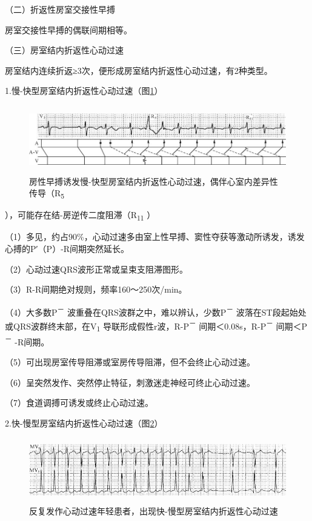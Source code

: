 （二）折返性房室交接性早搏

房室交接性早搏的偶联间期相等。

（三）房室结内折返性心动过速

房室结内连续折返≥3次，便形成房室结内折返性心动过速，有2种类型。

1.慢-快型房室结内折返性心动过速（图\ref{fig14-11}）

\begin{figure}[!htbp]
 \centering
 \includegraphics[width=5.79167in,height=1.15625in]{./images/Image00257.jpg}
 \captionsetup{justification=centering}
 \caption{房性早搏诱发慢-快型房室结内折返性心动过速，偶伴心室内差异性传导（R\textsubscript{5}}
 \label{fig14-11}
  \end{figure} 
），可能存在结-房逆传二度阻滞（R\textsubscript{11} ）

（1）多见，约占90\%，心动过速多由室上性早搏、窦性夺获等激动所诱发，诱发心搏的P′（P）-R间期突然延长。

（2）心动过速QRS波形正常或呈束支阻滞图形。

（3）R-R间期绝对规则，频率160～250次/min。

（4）大多数P\textsuperscript{－}
波重叠在QRS波群之中，难以辨认，少数P\textsuperscript{－}
波落在ST段起始处或QRS波群终末部，在V\textsubscript{1}
导联形成假性r波，R-P\textsuperscript{－}
间期＜0.08s，R-P\textsuperscript{－} 间期＜P\textsuperscript{－}
-R间期。

（5）可出现房室传导阻滞或室房传导阻滞，但不会终止心动过速。

（6）呈突然发作、突然停止特征，刺激迷走神经可终止心动过速。

（7）食道调搏可诱发或终止心动过速。

2.快-慢型房室结内折返性心动过速（图\ref{fig14-12}）

\begin{figure}[!htbp]
 \centering
 \includegraphics[width=5.58333in,height=1.11458in]{./images/Image00258.jpg}
 \captionsetup{justification=centering}
 \caption{反复发作心动过速年轻患者，出现快-慢型房室结内折返性心动过速}
 \label{fig14-12}
  \end{figure} 

